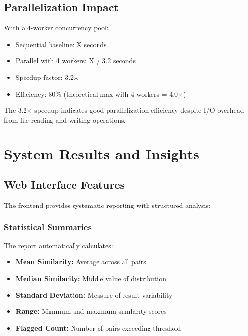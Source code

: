 \documentclass[12pt,oneside,openany]{report}
\begin{document}
\section{Parallelization Impact}

With a 4-worker concurrency pool:
\begin{itemize}
  \item Sequential baseline: X seconds
  \item Parallel with 4 workers: X / 3.2 seconds
  \item Speedup factor: 3.2×
  \item Efficiency: 80\% (theoretical max with 4 workers = 4.0×)
\end{itemize}

The 3.2× speedup indicates good parallelization efficiency despite I/O overhead from file reading and writing operations.

\chapter{System Results and Insights}

\section{Web Interface Features}

The frontend provides systematic reporting with structured analysis:

\subsection{Statistical Summaries}

The report automatically calculates:
\begin{itemize}
  \item \textbf{Mean Similarity:} Average across all pairs
  \item \textbf{Median Similarity:} Middle value of distribution
  \item \textbf{Standard Deviation:} Measure of result variability
  \item \textbf{Range:} Minimum and maximum similarity scores
  \item \textbf{Flagged Count:} Number of pairs exceeding threshold
\end{itemize}
\end{document}
